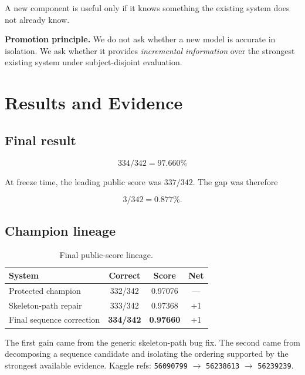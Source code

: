 \documentclass[12pt,a4paper]{article}
\begin{document}
A new component is useful only if it knows something the existing system does
not already know.

\begin{insightbox}
\textbf{Promotion principle.}
We do not ask whether a new model is accurate in isolation.
We ask whether it provides \emph{incremental information} over the strongest
existing system under subject-disjoint evaluation.
\end{insightbox}

\section{Results and Evidence}

\subsection{Final result}

\[
\boxed{
334/342 = 97.660\%
}
\]

At freeze time, the leading public score was \(337/342\). The gap was therefore

\[
3/342 = 0.877\%.
\]

\subsection{Champion lineage}

\begin{table}[ht]
\centering
\small
\begin{tabular}{lccc}
\toprule
\textbf{System} & \textbf{Correct} & \textbf{Score} & \textbf{Net} \\
\midrule
Protected champion & 332/342 & 0.97076 & --- \\
Skeleton-path repair & 333/342 & 0.97368 & +1 \\
Final sequence correction & \textbf{334/342} & \textbf{0.97660} & +1 \\
\bottomrule
\end{tabular}
\caption{Final public-score lineage.}
\end{table}

The first gain came from the generic skeleton-path bug fix. The second came
from decomposing a sequence candidate and isolating the ordering supported by
the strongest available evidence. Kaggle refs: \texttt{56090799} $\rightarrow$
\texttt{56238613} $\rightarrow$ \texttt{56239239}.
\end{document}
